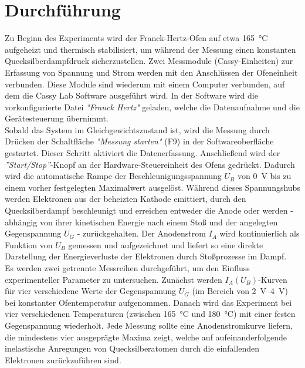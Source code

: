 \section{Durchführung}

Zu Beginn des Experiments wird der Franck-Hertz-Ofen auf etwa \SI{165}{\celsius} aufgeheizt und thermisch stabilisiert, um während der Messung einen konstanten Quecksilberdampfdruck sicherzustellen. Zwei Messmodule (Cassy-Einheiten) zur Erfassung von Spannung und Strom werden mit den Anschlüssen der Ofeneinheit verbunden. Diese Module sind wiederum mit einem Computer verbunden, auf dem die Cassy Lab Software ausgeführt wird. In der Software wird die vorkonfigurierte Datei \textit{"Franck Hertz"} geladen, welche die Datenaufnahme und die Gerätesteuerung übernimmt.
\vspace{0.3cm}\\
Sobald das System im Gleichgewichtszustand ist, wird die Messung durch Drücken der Schaltfläche \textit{"Messung starten"} (F9) in der Softwareoberfläche gestartet. Dieser Schritt aktiviert die Datenerfassung. Anschließend wird der \textit{''Start/Stop''}-Knopf an der Hardware-Steuereinheit des Ofens gedrückt. Dadurch wird die automatische Rampe der Beschleunigungsspannung $U_B$ von \SI{0}{\volt} bis zu einem vorher festgelegten Maximalwert ausgelöst. Während dieses Spannungshubs werden Elektronen aus der beheizten Kathode emittiert, durch den Quecksilberdampf beschleunigt und erreichen entweder die Anode oder werden - abhängig von ihrer kinetischen Energie nach einem Stoß und der angelegten Gegenspannung $U_G$ - zurückgehalten. Der Anodenstrom $I_A$ wird kontinuierlich als Funktion von $U_B$ gemessen und aufgezeichnet und liefert so eine direkte Darstellung der Energieverluste der Elektronen durch Stoßprozesse im Dampf.
\vspace{0.3cm}\\
Es werden zwei getrennte Messreihen durchgeführt, um den Einfluss experimenteller Parameter zu untersuchen. Zunächst werden $I_A(U_B)$-Kurven für vier verschiedene Werte der Gegenspannung $U_G$ (im Bereich von \SIrange{2}{4}{\volt}) bei konstanter Ofentemperatur aufgenommen. Danach wird das Experiment bei vier verschiedenen Temperaturen (zwischen \SI{165}{\celsius} und \SI{180}{\celsius}) mit einer festen Gegenspannung wiederholt. Jede Messung sollte eine Anodenstromkurve liefern, die mindestens vier ausgeprägte Maxima zeigt, welche auf aufeinanderfolgende inelastische Anregungen von Quecksilberatomen durch die einfallenden Elektronen zurückzuführen sind.
\vspace{0.3cm}\\
